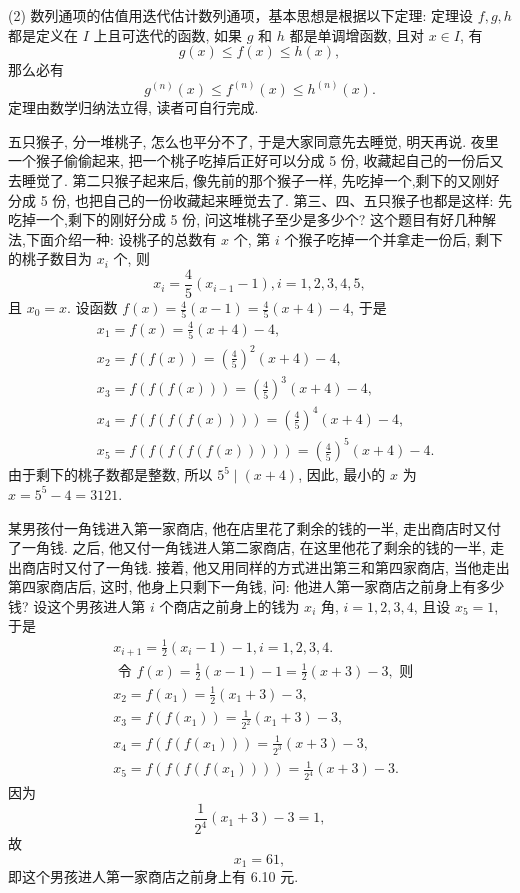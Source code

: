 (2) 数列通项的估值用迭代估计数列通项，基本思想是根据以下定理:
定理设 $f, g, h$ 都是定义在 $I$ 上且可迭代的函数, 如果 $g$ 和 $h$ 都是单调增函数, 且对 $x \in I$, 有
$$
g(x) \leqslant f(x) \leqslant h(x),
$$
那么必有
$$
g^{(n)}(x) \leqslant f^{(n)}(x) \leqslant h^{(n)}(x) .
$$
定理由数学归纳法立得, 读者可自行完成.



五只猴子, 分一堆桃子, 怎么也平分不了, 于是大家同意先去睡觉, 明天再说.
夜里一个猴子偷偷起来, 把一个桃子吃掉后正好可以分成 5 份, 收藏起自己的一份后又去睡觉了.
第二只猴子起来后, 像先前的那个猴子一样, 先吃掉一个,剩下的又刚好分成 5 份, 也把自己的一份收藏起来睡觉去了.
第三、四、五只猴子也都是这样: 先吃掉一个,剩下的刚好分成 5 份, 问这堆桃子至少是多少个?
这个题目有好几种解法,下面介绍一种:
设桃子的总数有 $x$ 个, 第 $i$ 个猴子吃掉一个并拿走一份后, 剩下的桃子数目为 $x_i$ 个, 则
$$
x_i=\frac{4}{5}\left(x_{i-1}-1\right), i=1,2,3,4,5,
$$
且 $x_0=x$.
设函数 $f(x)=\frac{4}{5}(x-1)=\frac{4}{5}(x+4)-4$, 于是
$$
\begin{aligned}
& x_1=f(x)=\frac{4}{5}(x+4)-4, \\
& x_2=f(f(x))=\left(\frac{4}{5}\right)^2(x+4)-4, \\
& x_3=f(f(f(x)))=\left(\frac{4}{5}\right)^3(x+4)-4, \\
& x_4=f(f(f(f(x))))=\left(\frac{4}{5}\right)^4(x+4)-4, \\
& x_5=f(f(f(f(f(x)))))=\left(\frac{4}{5}\right)^5(x+4)-4 .
\end{aligned}
$$
由于剩下的桃子数都是整数, 所以 $5^5 \mid(x+4)$, 因此, 最小的 $x$ 为 $x= 5^5-4=3121$.



某男孩付一角钱进入第一家商店, 他在店里花了剩余的钱的一半, 走出商店时又付了一角钱.
之后, 他又付一角钱进人第二家商店, 在这里他花了剩余的钱的一半, 走出商店时又付了一角钱.
接着, 他又用同样的方式进出第三和第四家商店, 当他走出第四家商店后, 这时, 他身上只剩下一角钱, 问: 他进人第一家商店之前身上有多少钱?
设这个男孩进人第 $i$ 个商店之前身上的钱为 $x_i$ 角, $i=1,2,3,4$, 且设 $x_5=1$, 于是
$$
\begin{aligned}
& x_{i+1}=\frac{1}{2}\left(x_i-1\right)-1, i=1,2,3,4 . \\
& \text { 令 } f(x)=\frac{1}{2}(x-1)-1=\frac{1}{2}(x+3)-3, \text { 则 } \\
& x_2=f\left(x_1\right)=\frac{1}{2}\left(x_1+3\right)-3, \\
& x_3=f\left(f\left(x_1\right)\right)=\frac{1}{2^2}\left(x_1+3\right)-3, \\
& x_4=f\left(f\left(f\left(x_1\right)\right)\right)=\frac{1}{2^3}(x+3)-3, \\
& x_5=f\left(f\left(f\left(f\left(x_1\right)\right)\right)\right)=\frac{1}{2^4}(x+3)-3 .
\end{aligned}
$$
因为
$$
\frac{1}{2^4}\left(x_1+3\right)-3=1,
$$
故
$$
x_1=61,
$$
即这个男孩进人第一家商店之前身上有 6.10 元.



